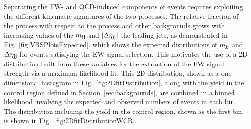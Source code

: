 Separating the EW- and QCD-induced components of \WZjj events requires exploiting the different 
kinematic signatures of the two processes.
The relative fraction of the \EWWZ process with respect to the \QCDWZ process and other backgrounds
grows with increasing values of the $m_{\mathrm{jj}}$ and $\left|\Delta\eta_{\mathrm{jj}}\right|$
the leading jets, as demonstrated in Fig.~\ref{fig:VBSPlotsExpected},
which shows the expected distributions of $m_{\mathrm{jj}}$ and $\Delta\eta_{\mathrm{jj}}$ for events satisfying the EW signal selection.
This motivates the use of a 2D distribution built from these variables for the extraction of the EW \WZjj
signal strength via a maximum likelihood fit.
This 2D distribution, 
shown as a one-dimensional histogram in Fig.~\ref{fig:2DfitDistribution},
along with the yield in the control region defined in 
Section~\ref{sec:backgrounds}, are combined in a binned likelihood
involving the expected and observed numbers of events in each bin.
The distribution including the yield in the \QCDWZ control region, shown as the first bin,
is shown in Fig.~\ref{fig:2DfitDistributionWCR}.

